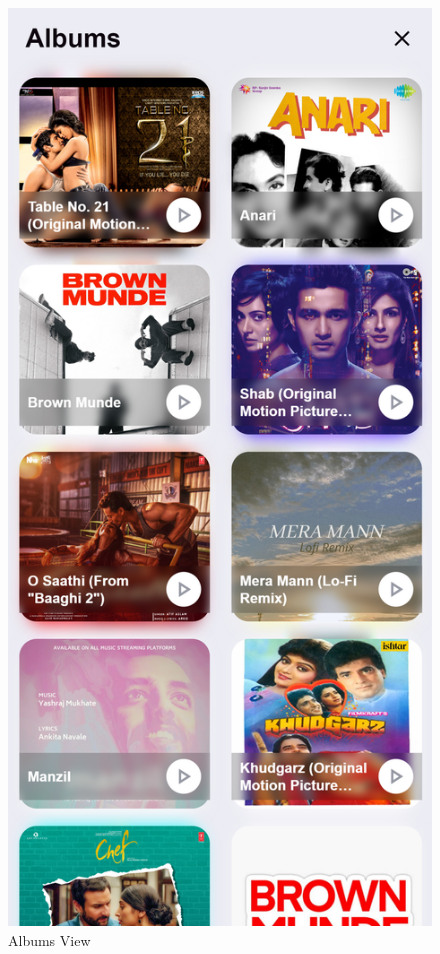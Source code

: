 \begin{figure}[H]
  \caption{Albums View}
  \includegraphics[scale=.2]{./screenshot1.png}

\end{figure}
